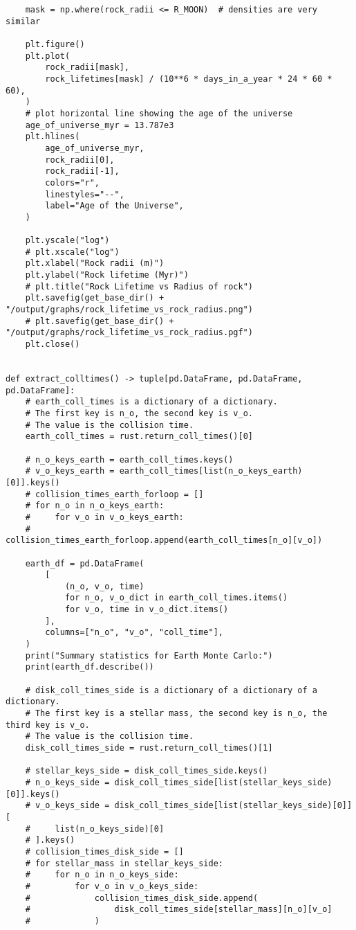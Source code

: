 \begin{lstlisting}
    mask = np.where(rock_radii <= R_MOON)  # densities are very similar

    plt.figure()
    plt.plot(
        rock_radii[mask],
        rock_lifetimes[mask] / (10**6 * days_in_a_year * 24 * 60 * 60),
    )
    # plot horizontal line showing the age of the universe
    age_of_universe_myr = 13.787e3
    plt.hlines(
        age_of_universe_myr,
        rock_radii[0],
        rock_radii[-1],
        colors="r",
        linestyles="--",
        label="Age of the Universe",
    )

    plt.yscale("log")
    # plt.xscale("log")
    plt.xlabel("Rock radii (m)")
    plt.ylabel("Rock lifetime (Myr)")
    # plt.title("Rock Lifetime vs Radius of rock")
    plt.savefig(get_base_dir() + "/output/graphs/rock_lifetime_vs_rock_radius.png")
    # plt.savefig(get_base_dir() + "/output/graphs/rock_lifetime_vs_rock_radius.pgf")
    plt.close()


def extract_colltimes() -> tuple[pd.DataFrame, pd.DataFrame, pd.DataFrame]:
    # earth_coll_times is a dictionary of a dictionary.
    # The first key is n_o, the second key is v_o.
    # The value is the collision time.
    earth_coll_times = rust.return_coll_times()[0]

    # n_o_keys_earth = earth_coll_times.keys()
    # v_o_keys_earth = earth_coll_times[list(n_o_keys_earth)[0]].keys()
    # collision_times_earth_forloop = []
    # for n_o in n_o_keys_earth:
    #     for v_o in v_o_keys_earth:
    #         collision_times_earth_forloop.append(earth_coll_times[n_o][v_o])

    earth_df = pd.DataFrame(
        [
            (n_o, v_o, time)
            for n_o, v_o_dict in earth_coll_times.items()
            for v_o, time in v_o_dict.items()
        ],
        columns=["n_o", "v_o", "coll_time"],
    )
    print("Summary statistics for Earth Monte Carlo:")
    print(earth_df.describe())

    # disk_coll_times_side is a dictionary of a dictionary of a dictionary.
    # The first key is a stellar mass, the second key is n_o, the third key is v_o.
    # The value is the collision time.
    disk_coll_times_side = rust.return_coll_times()[1]

    # stellar_keys_side = disk_coll_times_side.keys()
    # n_o_keys_side = disk_coll_times_side[list(stellar_keys_side)[0]].keys()
    # v_o_keys_side = disk_coll_times_side[list(stellar_keys_side)[0]][
    #     list(n_o_keys_side)[0]
    # ].keys()
    # collision_times_disk_side = []
    # for stellar_mass in stellar_keys_side:
    #     for n_o in n_o_keys_side:
    #         for v_o in v_o_keys_side:
    #             collision_times_disk_side.append(
    #                 disk_coll_times_side[stellar_mass][n_o][v_o]
    #             )


\end{lstlisting}
